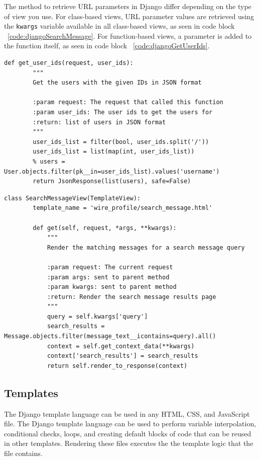 The method to retrieve URL parameters in Django differ depending on the type
of view you use. For class-based views, URL parameter values are retrieved using
the \texttt{kwargs} variable available in all class-based views, as seen in
code block ~\ref{code:djangoSearchMessage}. For function-based views, a
parameter is added to the function itself, as seen in code block ~\ref{code:djangoGetUserIds}. 

\begin{lstlisting}[caption={Function-based view for returning user data},label={code:djangoGetUserIds}]
    def get_user_ids(request, user_ids):
        """
        Get the users with the given IDs in JSON format

        :param request: The request that called this function
        :param user_ids: The user ids to get the users for
        :return: list of users in JSON format
        """
        user_ids_list = filter(bool, user_ids.split('/'))
        user_ids_list = list(map(int, user_ids_list))
        % users = User.objects.filter(pk__in=user_ids_list).values('username')
        return JsonResponse(list(users), safe=False)
\end{lstlisting}

\begin{lstlisting}[caption={Class-based view to search for a given message},label={code:djangoSearchMessage}]
    class SearchMessageView(TemplateView):
        template_name = 'wire_profile/search_message.html'

        def get(self, request, *args, **kwargs):
            """
            Render the matching messages for a search message query

            :param request: The current request
            :param args: sent to parent method
            :param kwargs: sent to parent method
            :return: Render the search message results page
            """
            query = self.kwargs['query']
            search_results = Message.objects.filter(message_text__icontains=query).all()
            context = self.get_context_data(**kwargs)
            context['search_results'] = search_results
            return self.render_to_response(context)
\end{lstlisting}

\subsection{Templates}
The Django template language can be used in any HTML, CSS, and JavaScript
file. The Django template language can be used to perform variable interpolation,
conditional checks, loops, and creating default blocks of code that can be reused
in other templates. Rendering these files executes the the template logic that the
file contains. \parencite{djangoTemplates}

